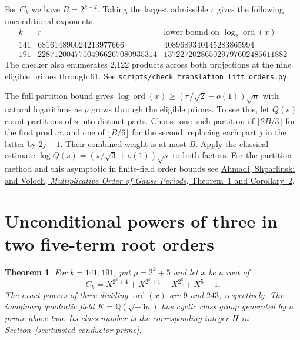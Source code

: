 \documentclass[11pt]{article}
\newtheorem{theorem}{Theorem}
\newcommand{\ord}{\operatorname{ord}}
\begin{document}
For \(C_k\) we have \(B=2^{k-2}\). Taking the largest admissible
\(r\) gives the following unconditional exponents.
\[
\begin{array}{r|r|r}
 k&r& \text{lower bound on }\log_2\ord(x)\\\hline
141&681614890024213977666&4089689340145283865994\\
191&22871200477504966267080935314&137227202865029797602485611882
\end{array}
\]
The checker also enumerates 2,122 products across both projections
at the nine eligible primes through 61. See
\nolinkurl{scripts/check_translation_lift_orders.py}.

The full partition bound gives
\(\log\ord(x)\ge(\pi/\sqrt2-o(1))\sqrt n\) with natural logarithms
as \(p\) grows through the eligible primes. To see this, let \(Q(s)\)
count partitions of \(s\) into distinct parts. Choose one such
partition of \(\lfloor2B/3\rfloor\) for the first product and one
of \(\lfloor B/6\rfloor\) for the second, replacing each part \(j\)
in the latter by \(2j-1\). Their combined weight is at most \(B\).
Apply the classical estimate
\(\log Q(s)=(\pi/\sqrt3+o(1))\sqrt s\) to both factors.
For the partition method and this asymptotic in finite-field
order bounds see \href{https://arxiv.org/abs/0707.4034}
{Ahmadi, Shparlinski and Voloch, \emph{Multiplicative Order of
Gauss Periods}, Theorem~1 and Corollary~2}.

\clearpage
\section{Unconditional powers of three in two five-term root orders}
\label{sec:twisted-three-class}

\begin{theorem}
For \(k=141,191\), put \(p=2^k+5\) and let \(x\) be a root of
\[
 C_k=X^{2^k+4}+X^{2^k+1}+X^{2^k}+X^5+1.
\]
The exact powers of three dividing \(\ord(x)\) are \(9\) and
\(243\), respectively. The imaginary quadratic field
\(K=\mathbb Q(\sqrt{-3p})\) has cyclic class group generated by a
prime above two. Its class number is the corresponding integer
\(H\) in Section~\ref{sec:twisted-conductor-prime}.
\end{theorem}
\end{document}
